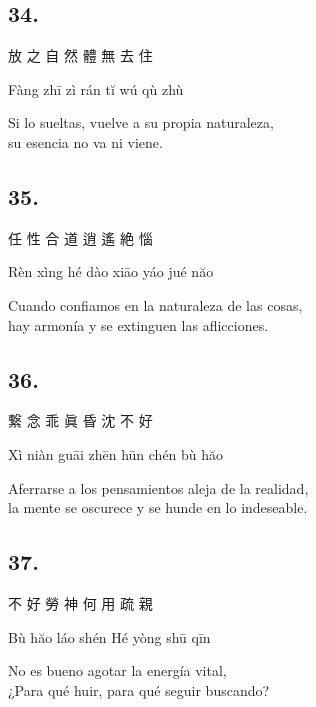 \documentclass[
  a5paperpaper,
]{article}
\begin{document}
\begin{verseblock}

\hypertarget{section-108}{%
\subsection{34.}\label{section-108}}

放 之 自 然 體 無 去 住

Fàng zhī zì rán tĭ wú qù zhù

Si lo sueltas, vuelve a su propia naturaleza,\\
su esencia no va ni viene.

\end{verseblock}

\begin{verseblock}

\hypertarget{section-109}{%
\subsection{35.}\label{section-109}}

任 性 合 道 逍 遙 絶 惱

Rèn xìng hé dào xiāo yáo jué năo

Cuando confiamos en la naturaleza de las cosas,\\
hay armonía y se extinguen las aflicciones.

\end{verseblock}

\begin{verseblock}

\hypertarget{section-110}{%
\subsection{36.}\label{section-110}}

繋 念 乖 眞 昏 沈 不 好

Xì niàn guāi zhēn hūn chén bù hăo

Aferrarse a los pensamientos aleja de la realidad,\\
la mente se oscurece y se hunde en lo indeseable.

\end{verseblock}

\begin{verseblock}

\hypertarget{section-111}{%
\subsection{37.}\label{section-111}}

不 好 勞 神 何 用 疏 親

Bù hăo láo shén Hé yòng shū qīn

No es bueno agotar la energía vital,\\
¿Para qué huir, para qué seguir buscando?

\end{verseblock}
\end{document}
